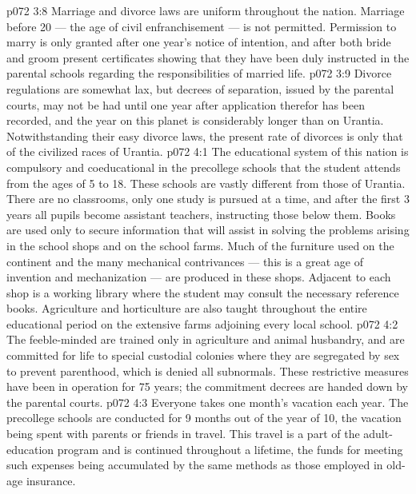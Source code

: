\vs p072 3:8 Marriage and divorce laws are uniform throughout the nation. Marriage before 20 --- the age of civil enfranchisement --- is not permitted. Permission to marry is only granted after one year’s notice of intention, and after both bride and groom present certificates showing that they have been duly instructed in the parental schools regarding the responsibilities of married life.
\vs p072 3:9 Divorce regulations are somewhat lax, but decrees of separation, issued by the parental courts, may not be had until one year after application therefor has been recorded, and the year on this planet is considerably longer than on Urantia. Notwithstanding their easy divorce laws, the present rate of divorces is only  that of the civilized races of Urantia.
\vs p072 4:1 The educational system of this nation is compulsory and coeducational in the precollege schools that the student attends from the ages of 5 to 18. These schools are vastly different from those of Urantia. There are no classrooms, only one study is pursued at a time, and after the first 3 years all pupils become assistant teachers, instructing those below them. Books are used only to secure information that will assist in solving the problems arising in the school shops and on the school farms. Much of the furniture used on the continent and the many mechanical contrivances --- this is a great age of invention and mechanization --- are produced in these shops. Adjacent to each shop is a working library where the student may consult the necessary reference books. Agriculture and horticulture are also taught throughout the entire educational period on the extensive farms adjoining every local school.
\vs p072 4:2 \pc The feeble\hyp{}minded are trained only in agriculture and animal husbandry, and are committed for life to special custodial colonies where they are segregated by sex to prevent parenthood, which is denied all subnormals. These restrictive measures have been in operation for 75 years; the commitment decrees are handed down by the parental courts.
\vs p072 4:3 \pc Everyone takes one month’s vacation each year. The precollege schools are conducted for 9 months out of the year of 10, the vacation being spent with parents or friends in travel. This travel is a part of the adult\hyp{}education program and is continued throughout a lifetime, the funds for meeting such expenses being accumulated by the same methods as those employed in old\hyp{}age insurance.
